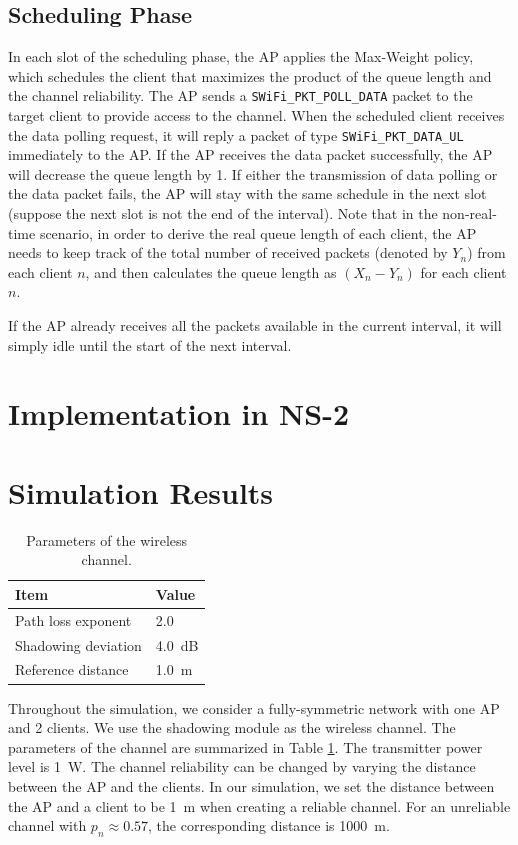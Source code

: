 \documentclass{article}
\begin{document}
\subsection{Scheduling Phase}
In each slot of the scheduling phase, the AP applies the Max-Weight policy, which schedules the client that maximizes the product of the queue length and the channel reliability. The AP sends a \lstinline|SWiFi_PKT_POLL_DATA| packet to the target client to provide access to the channel. When the scheduled client receives the data polling request, it will reply a packet of type \lstinline|SWiFi_PKT_DATA_UL| immediately to the AP. If the AP receives the data packet successfully, the AP will decrease the queue length by 1. If either the transmission of data polling or the data packet fails, the AP will stay with the same schedule in the next slot (suppose the next slot is not the end of the interval). Note that in the non-real-time scenario, in order to derive the real queue length of each client, the AP needs to keep track of the total number of received packets (denoted by $Y_n$) from each client $n$, and then calculates the queue length as $(X_n - Y_n)$ for each client $n$.

If the AP already receives all the packets available in the current interval, it will simply idle until the start of the next interval.

     

\section{Implementation in NS-2}
\label{section: ns2}


\section{Simulation Results}
\begin{table}[htbp]
\centering
    \caption{Parameters of the wireless channel.}
    \vspace{2mm}
    \begin{tabular}{ | l | l | }
    \hline
    Item & Value \\ \hline
    Path loss exponent & 2.0  \\ \hline
    Shadowing deviation & \SI{4.0}{dB} \\ \hline
    Reference distance & \SI{1.0}{m} \\
    \hline
\end{tabular}
\label{table: channel}
\end{table}
Throughout the simulation, we consider a fully-symmetric network with one AP and 2 clients. We use the shadowing module as the wireless channel. The parameters of the channel are summarized in Table \ref{table: channel}. The transmitter power level is \SI{1}{W}. The channel reliability can be changed by varying the distance between the AP and the clients. In our simulation, we set the distance between the AP and a client to be \SI{1}{m} when creating a reliable channel. For an unreliable channel with $p_n\approx 0.57$, the corresponding distance is \SI{1000}{m}. 
\end{document}

